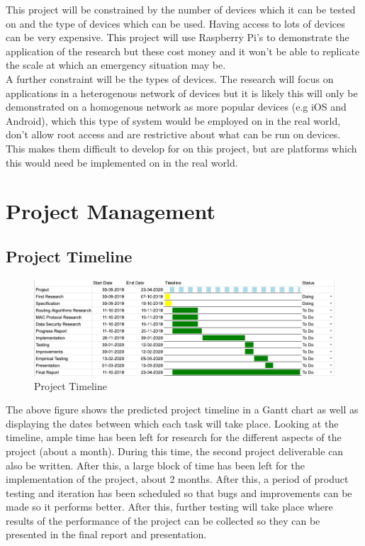 \documentclass{report}
\begin{document}
This project will be constrained by the number of devices which it can be tested on and the type of devices which can be used. Having access 
to lots of devices can be very expensive. This project will use Raspberry Pi's to demonstrate the application of the research but these cost 
money and it won't be able to replicate the scale at which an emergency situation may be.
\bigskip\\
A further constraint will be the types of devices. The research will focus on applications in a heterogenous network of devices but it is 
likely this will only be demonstrated on a homogenous network as more popular devices (e.g iOS and Android\cite{mobileOS}), which this type of system would be employed on in the 
real world, don't allow root access and are restrictive about what can be run on devices. This makes them difficult to develop for on this project, but are platforms which 
this would need be implemented on in the real world.

\chapter*{Project Management}

\section*{Project Timeline}
\begin{figure}
    \centering
    \includegraphics[scale=0.35]{ProjectTimeline}
    \caption{Project Timeline}
    \label{fig:project-timeline}
\end{figure}
\bigskip

The above figure shows the predicted project timeline in a Gantt chart as well as displaying the dates between 
which each task will take place. Looking at the timeline, ample time has been left for research for the different aspects of the 
project (about a month). During this time, the second project deliverable can also be written. After this, a large block of time 
has been left for the implementation of the project, about 2 months. After this, a period of product testing and iteration has been 
scheduled so that bugs and improvements can be made so it performs better. After this, further testing will take place where results 
of the performance of the project can be collected so they can be presented in the final report and presentation. 
\end{document}

